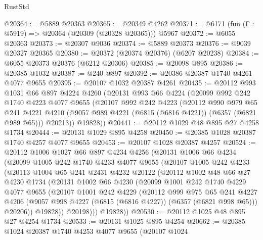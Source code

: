 \begin{lexlean}{RustStd}
\begin{coremodule}
@20364 := @5889 @20363
@20365 := @20349 @4262
@20371 := @6171 (fun (Γ : @5919) => @20364 (@20309 (@20328 @20365))) @5967
@20372 := @6055 @20363
@20373 := @20307 @9036
@20374 := @5889 @20373
@20376 := @9039 @20327 @20365
@20380 := @20372 (@20374 @20376) (@6207 @20238)
@20384 := @6055 @20373 @20376 (@6212 @20306)
@20385 := @20098 @895
@20386 := @20385 @1032
@20387 := @240 @897
@20392 := @20386 @20387 @1740 @4261 @4077 @9655
@20395 := @20107 @1032 @20387 @4261
@20435 := @20112
    @993
    @1031
    @66
    @897
    @4224
    @4260
    (@20131
      @993
      @66
      @4224
      (@20099
        @992
        @242
        @1740
        @4223
        @4077
        @9655
        (@20107
          @992
          @242
          @4223
          (@20112
            @990
            @979
            @65
            @241
            @4221
            @4210
            (@9057 @989 @4221 (@6815 (@6816 @4221)) (@6357 (@6821 @989 @65)))
            @20213))
        @19828))
@20441 := @20112 @1029 @48 @895 @27 @4258 @1734
@20444 := @20131 @1029 @895 @4258
@20450 := @20385 @1028 @20387 @1740 @4257 @4077 @9655
@20453 := @20107 @1028 @20387 @4257
@20524 := @20112
    @1006
    @1027
    @66
    @897
    @4234
    @4256
    (@20131
      @1006
      @66
      @4234
      (@20099
        @1005
        @242
        @1740
        @4233
        @4077
        @9655
        (@20107
          @1005
          @242
          @4233
          (@20113
            @1004
            @65
            @241
            @2431
            @4232
            @20122
            (@20112
              @1002
              @48
              @66
              @27
              @4230
              @1734
              (@20131
                @1002
                @66
                @4230
                (@20099
                  @1001
                  @242
                  @1740
                  @4229
                  @4077
                  @9655
                  (@20107
                    @1001
                    @242
                    @4229
                    (@20112
                      @999
                      @975
                      @65
                      @241
                      @4227
                      @4206
                      (@9057 @998 @4227 (@6815 (@6816 @4227)) (@6357 (@6821 @998 @65)))
                      @20206))
                  @19828))
              @20198)))
        @19828))
@20530 := @20112 @1025 @48 @895 @27 @4254 @1734
@20533 := @20131 @1025 @895 @4254
@20662 := @20385
    @1024
    @20387
    @1740
    @4253
    @4077
    @9655
    (@20107
      @1024

\end{coremodule}
\end{lexlean}
